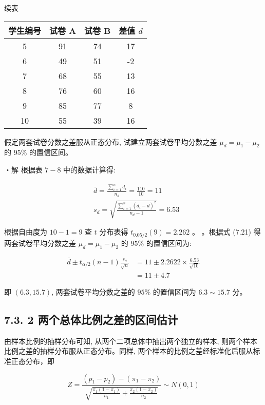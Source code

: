 \documentclass[10pt]{article}
\begin{document}
\begin{CJK*}{UTF8}{bsmi}
续表

\begin{center}
\begin{tabular}{cccc}
\hline
学生编号 & 试卷 A & 试卷 B & 差值 $d$ \\
\hline
5 & 91 & 74 & 17 \\
6 & 49 & 51 & -2 \\
7 & 68 & 55 & 13 \\
8 & 76 & 60 & 16 \\
9 & 85 & 77 & 8 \\
10 & 55 & 39 & 16 \\
\hline
\end{tabular}
\end{center}

假定两套试卷分数之差服从正态分布, 试建立两套试卷平均分数之差 $\mu_{d}=\mu_{1}-\mu_{2}$ 的 $95 \%$ 的置信区间。

・解 根据表 $7-8$ 中的数据计算得:

$$
\begin{aligned}
& \bar{d}=\frac{\sum_{i=1}^{n} d_{i}}{n_{d}}=\frac{110}{10}=11 \\
& s_{d}=\sqrt{\frac{\sum_{i=1}^{n}\left(d_{i}-\bar{d}\right)^{2}}{n_{d}-1}}=6.53
\end{aligned}
$$

根据自由度为 $10-1=9$ 查 $t$ 分布表得 $t_{0.05 / 2}(9)=2.262$ 。 。根据式 (7.21) 得两套试卷平均分数之差 $\mu_{d}=\mu_{1}-\mu_{2}$ 的 $95 \%$ 的置信区间为:

$$
\begin{aligned}
\bar{d} \pm t_{\alpha / 2}(n-1) \frac{s_{d}}{\sqrt{n}} & =11 \pm 2.2622 \times \frac{6.53}{\sqrt{10}} \\
& =11 \pm 4.7
\end{aligned}
$$

即 $(6.3,15.7)$, 两套试卷平均分数之差的 $95 \%$ 的置信区间为 $6.3 \sim 15.7$ 分。

\subsection*{7.3. 2 两个总体比例之差的区间估计}
由样本比例的抽样分布可知, 从两个二项总体中抽出两个独立的样本, 则两个样本比例之差的抽样分布服从正态分布。同样, 两个样本的比例之差经标准化后服从标准正态分布，即


\begin{equation*}
Z=\frac{\left(p_{1}-p_{2}\right)-\left(\pi_{1}-\pi_{2}\right)}{\sqrt{\frac{\pi_{1}\left(1-\pi_{1}\right)}{n_{1}}+\frac{\pi_{2}\left(1-\pi_{2}\right)}{n_{2}}}} \sim N(0,1) \tag{7.22}
\end{equation*}



\end{CJK*}
\end{document}
